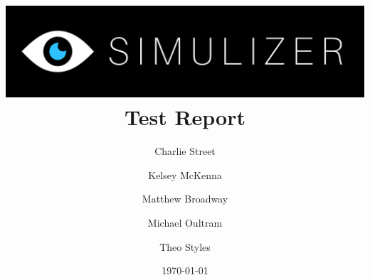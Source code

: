 \documentclass[12pt, a4paper]{article}
\title{
  \includegraphics[width=\textwidth]{segments/SimulizerLogo.png}
  \huge\textbf{Test Report}
}
\author{
  Charlie Street
  \and
  Kelsey McKenna
  \and
  Matthew Broadway
  \and
  Michael Oultram
  \and
  Theo Styles
}
\date{\today}
\begin{document}
\maketitle



\begin{landscape}

\end{landscape}



\end{document}
